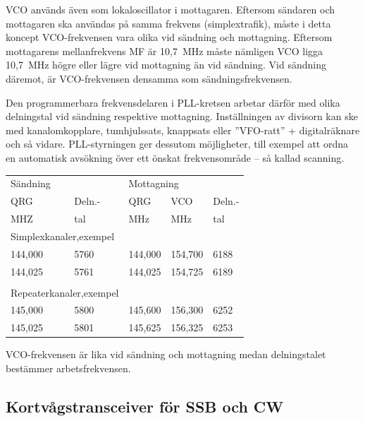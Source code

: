 VCO används även som lokaloscillator i mottagaren.
Eftersom sändaren och mottagaren ska användas på samma frekvens
(simplextrafik), måste i detta koncept VCO-frekvensen vara olika vid
sändning och mottagning.
Eftersom mottagarens mellanfrekvens MF är 10,7~MHz måste nämligen VCO
ligga 10,7~MHz högre eller lägre vid mottagning än vid sändning.
Vid sändning däremot, är VCO-frekvensen densamma som sändningsfrekvensen.

Den programmerbara frekvensdelaren i PLL-kretsen arbetar därför med
olika delningstal vid sändning respektive mottagning.
Inställningen av divisorn kan ske med kanalomkopplare, tumhjulssats,
knappsats eller ''VFO-ratt'' + digitalräknare och så vidare.
PLL-styrningen ger dessutom möjligheter, till exempel att ordna en automatisk
avsökning över ett önskat frekvensområde -- så kallad scanning.

\begin{table}[ht]
\begin{center}
  \begin{tabular}{ll|lll}
    \multicolumn{2}{l|}{Sändning} &
    \multicolumn{3}{l}{Mottagning} \\
    QRG & Deln.- & QRG & VCO & Deln.- \\
    MHZ & tal    & MHz & MHz & tal \\
    \hline
    \multicolumn{2}{l|}{Simplexkanaler,exempel} & & & \\
    144,000 & 5760 & 144,000 & 154,700 & 6188 \\
    144,025 & 5761 & 144,025 & 154,725 & 6189 \\
    & & & & \\
    \multicolumn{2}{l|}{Repeaterkanaler,exempel} & & & \\
    145,000 & 5800 & 145,600 & 156,300 & 6252 \\
    145,025 & 5801 & 145,625 & 156,325 & 6253 \\
  \end{tabular}
\end{center}
\end{table}

VCO-frekvensen är lika vid sändning och mottagning medan delningstalet
bestämmer arbetsfrekvensen.

\subsection{Kortvågstransceiver för SSB och CW}

